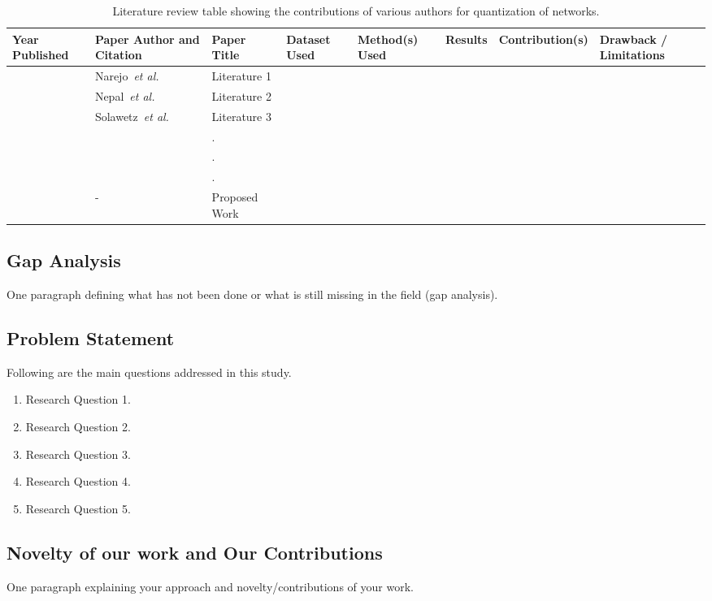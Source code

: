 \documentclass[conference]{IEEEtran}
\begin{document}
\begin{table*}[!ht]
\label{tab:LiteratureSummary}
\caption{Literature review table showing the contributions of various authors for quantization of networks.}
\begin{tabular}{|p{1.5cm}|l|l|l|l|l|l|l|} \hline
Year Published & Paper Author and Citation & Paper Title   & Dataset Used & Method(s) Used & Results & Contribution(s) & Drawback / Limitations \\ \hline
 & Narejo~\textit{et al.}~\cite{b1} & Literature 1 &   &   &   &    &   \\ \hline
 & Nepal~\textit{et al.}~\cite{b2} & Literature 2  &   &    &    &    & \\ \hline
 & Solawetz~\textit{et al.}~\cite{b4} & Literature 3  &   &   &   &   &   \\ \hline
 &   & . &   &   &   &   & \\ \hline
 &   & . &   &   &   &   & \\ \hline
 &   & . &   &   &   &   & \\ \hline
 & - & Proposed Work &   &   &   &   & \\ \hline
\end{tabular}
\end{table*}

\subsection{Gap Analysis}
One paragraph defining what has not been done or what is still missing in the field (gap analysis).

\subsection{Problem Statement}
Following are the main questions addressed in this study.

\begin{enumerate}
    \item Research Question 1.
    \item Research Question 2.
    \item Research Question 3.
    \item Research Question 4.
    \item Research Question 5.
\end{enumerate}

\subsection{Novelty of our work and Our Contributions}
One paragraph explaining your approach and novelty/contributions of your work.
\end{document}
